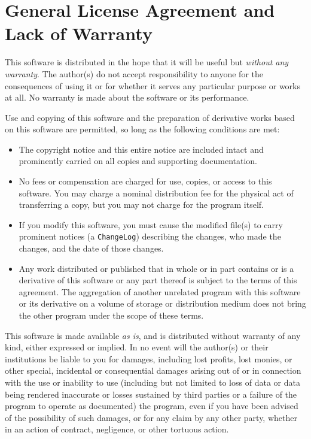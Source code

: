 \section*{General License Agreement and Lack of Warranty\label{licence}}%
This software is distributed in the hope that it will be useful
but \emph{without any warranty}. The author(s) do not accept responsibility 
to anyone for the consequences of using it or for whether it serves 
any particular purpose or works at all. No warranty is made about 
the software or its performance. 
 
Use and copying of this software and the preparation of derivative
works based on this software are permitted, so long as the following
conditions are met:
\begin{itemize}
\item 
The copyright notice and this entire notice are included intact
and prominently carried on all copies and supporting documentation.
\item 
No fees or compensation are charged for use, copies, or
access to this software. You may charge a nominal
distribution fee for the physical act of transferring a
copy, but you may not charge for the program itself. 
\item 
If you modify this software, you must cause the modified
file(s) to carry prominent notices (a \texttt{ChangeLog})
describing the changes, who made the changes, and the date
of those changes.
\item  
Any work distributed or published that in whole or in part
contains or is a derivative of this software or any part 
thereof is subject to the terms of this agreement. The 
aggregation of another unrelated program with this software
or its derivative on a volume of storage or distribution
medium does not bring the other program under the scope
of these terms.
\end{itemize} 
This software is made available \emph{as is}, and is distributed without 
warranty of any kind, either expressed or implied.
In no event will the author(s) or their institutions be liable to you
for damages, including lost profits, lost monies, or other special,
incidental or consequential damages arising out of or in connection
with the use or inability to use (including but not limited to loss of
data or data being rendered inaccurate or losses sustained by third
parties or a failure of the program to operate as documented) the 
program, even if you have been advised of the possibility of such
damages, or for any claim by any other party, whether in an action of
contract, negligence, or other tortuous action.

